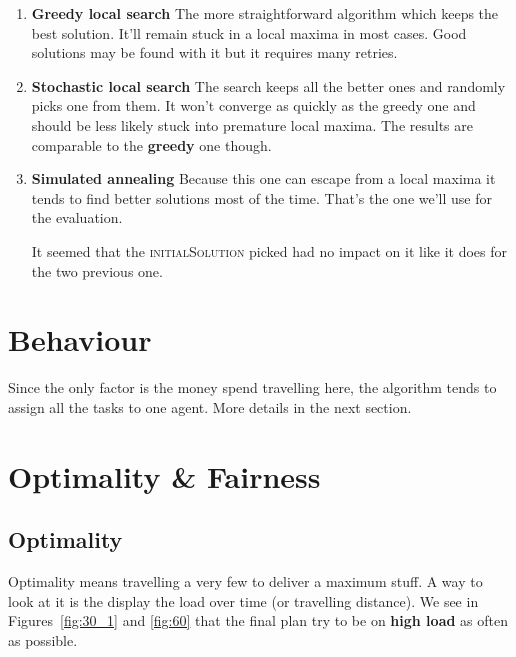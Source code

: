 \documentclass[11pt,a4paper]{article}
\begin{document}
\begin{enumerate}
    \item \textbf{Greedy local search}
        The more straightforward algorithm which keeps the best solution. It'll
        remain stuck in a local maxima in most cases. Good solutions may be
        found with it but it requires many retries.

    \item \textbf{Stochastic local search}
        The search keeps all the better ones and randomly picks one from them.
        It won't converge as quickly as the greedy one and should be less
        likely stuck into premature local maxima. The results are comparable
        to the \textbf{greedy} one though.


    \item \textbf{Simulated annealing}
        Because this one can escape from a local maxima it tends to find better
        solutions most of the time. That's the one we'll use for the evaluation.

        It seemed that the \textsc{initialSolution} picked had no impact on it
        like it does for the two previous one.

\end{enumerate}


\section*{Behaviour}

Since the only factor is the money spend travelling here, the algorithm tends
to assign all the tasks to one agent. More details in the next section.


\section*{Optimality \& Fairness}

\subsection*{Optimality}

Optimality means travelling a very few to deliver a maximum stuff. A way to
look at it is the display the load over time (or travelling distance). We see
in Figures~\ref{fig:30_1} and \ref{fig:60} that the final plan try to be on
\textbf{high load} as often as possible.
\end{document}
